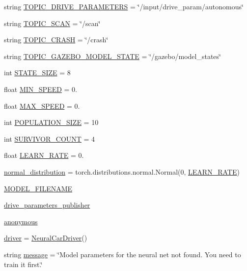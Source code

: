\begin{DoxyCompactItemize}
\item 
string \hyperlink{namespaceneural__car__driver_a161258e51d15f04d9063e42ef5c7be6a}{T\+O\+P\+I\+C\+\_\+\+D\+R\+I\+V\+E\+\_\+\+P\+A\+R\+A\+M\+E\+T\+E\+RS} = \char`\"{}/input/drive\+\_\+param/autonomous\char`\"{}
\item 
string \hyperlink{namespaceneural__car__driver_aa0a0413ce25fecb4d35f07c7fea06a8c}{T\+O\+P\+I\+C\+\_\+\+S\+C\+AN} = \char`\"{}/scan\char`\"{}
\item 
string \hyperlink{namespaceneural__car__driver_a6f5373020b03b73072779ffc5d44482d}{T\+O\+P\+I\+C\+\_\+\+C\+R\+A\+SH} = \char`\"{}/crash\char`\"{}
\item 
string \hyperlink{namespaceneural__car__driver_a8e8319dbdbdbc3c32c3184c82f9c3f80}{T\+O\+P\+I\+C\+\_\+\+G\+A\+Z\+E\+B\+O\+\_\+\+M\+O\+D\+E\+L\+\_\+\+S\+T\+A\+TE} = \char`\"{}/gazebo/model\+\_\+states\char`\"{}
\item 
int \hyperlink{namespaceneural__car__driver_ac9d3bc133f799be5e8c5c55884d10a8d}{S\+T\+A\+T\+E\+\_\+\+S\+I\+ZE} = 8
\item 
float \hyperlink{namespaceneural__car__driver_a5292cc13090a4c357e023f5732a8a18a}{M\+I\+N\+\_\+\+S\+P\+E\+ED} = 0.
\item 
float \hyperlink{namespaceneural__car__driver_af2fef2c19127bf0b4e990d28542c7b6f}{M\+A\+X\+\_\+\+S\+P\+E\+ED} = 0.
\item 
int \hyperlink{namespaceneural__car__driver_aaf8ade0766a9fd72a41c1029d04d6d5e}{P\+O\+P\+U\+L\+A\+T\+I\+O\+N\+\_\+\+S\+I\+ZE} = 10
\item 
int \hyperlink{namespaceneural__car__driver_ad40064153991947271d4a197983593fa}{S\+U\+R\+V\+I\+V\+O\+R\+\_\+\+C\+O\+U\+NT} = 4
\item 
float \hyperlink{namespaceneural__car__driver_a3873d214234a7685f0003bdedb09a3b5}{L\+E\+A\+R\+N\+\_\+\+R\+A\+TE} = 0.
\item 
\hyperlink{namespaceneural__car__driver_a953d05d55cd2232a21159009976855f3}{normal\+\_\+distribution} = torch.\+distributions.\+normal.\+Normal(0, \hyperlink{namespaceneural__car__driver_a3873d214234a7685f0003bdedb09a3b5}{L\+E\+A\+R\+N\+\_\+\+R\+A\+TE})
\item 
\hyperlink{namespaceneural__car__driver_a067bf25e6557471566d69b477b79ade5}{M\+O\+D\+E\+L\+\_\+\+F\+I\+L\+E\+N\+A\+ME}
\item 
\hyperlink{namespaceneural__car__driver_ac075b2fda9db2b43e338511958cfe9c2}{drive\+\_\+parameters\+\_\+publisher}
\item 
\hyperlink{namespaceneural__car__driver_ae254923f6ec524f563a598feeee010b9}{anonymous}
\item 
\hyperlink{namespaceneural__car__driver_a277afd40b4a20897467cac1f802344ee}{driver} = \hyperlink{classneural__car__driver_1_1_neural_car_driver}{Neural\+Car\+Driver}()
\item 
string \hyperlink{namespaceneural__car__driver_a65829420a3ca6888c41c04e36ad0c4fb}{message} = \char`\"{}Model parameters for the neural net not found. You need to train it first.\char`\"{}
\end{DoxyCompactItemize}


